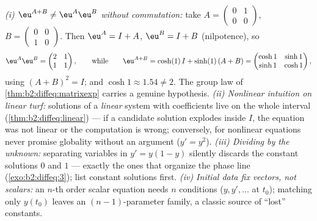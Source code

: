 \begin{remark}
\emph{(i) $\eu^{A+B} \neq \eu^A\eu^B$ without commutation:}
take $A = \begin{pmatrix} 0 & 1\\ 0 & 0\end{pmatrix}$, $B =
\begin{pmatrix} 0 & 0\\ 1 & 0\end{pmatrix}$. Then $\eu^A = I +
A$, $\eu^B = I + B$ (nilpotence), so
\[
\eu^A\eu^B = \begin{pmatrix} 2 & 1\\ 1 & 1\end{pmatrix},
\qquad\text{while}\qquad
\eu^{A+B} = \cosh(1)\,I + \sinh(1)\,(A + B)
= \begin{pmatrix} \cosh 1 & \sinh 1\\ \sinh 1 & \cosh 1
\end{pmatrix},
\]
using $(A+B)^2 = I$; and $\cosh 1 \approx 1.54 \neq 2$. The
group law of \cref{thm:b2:diffeq:matrixexp} carries a genuine
hypothesis. \emph{(ii) Nonlinear intuition on linear turf:}
solutions of a \emph{linear} system with 
coefficients live on the whole interval
(\cref{thm:b2:diffeq:linear}) --- if a candidate solution
explodes inside $I$, the equation was not linear or the
computation is wrong; conversely, for nonlinear equations
never promise globality without an argument ($y' = y^2$).
\emph{(iii) Dividing by the unknown:} separating variables in
$y' = y(1-y)$ silently discards the constant solutions $0$ and
$1$ --- exactly the ones that organize the phase line
(\cref{exo:b2:diffeq:3}); list constant solutions first.
\emph{(iv) Initial data fix vectors, not scalars:} an $n$-th
order scalar equation needs $n$ conditions ($y, y', \dots$ at
$t_0$); matching only $y(t_0)$ leaves an
$(n-1)$-parameter family, a classic source of ``lost''
constants.
\end{remark}


